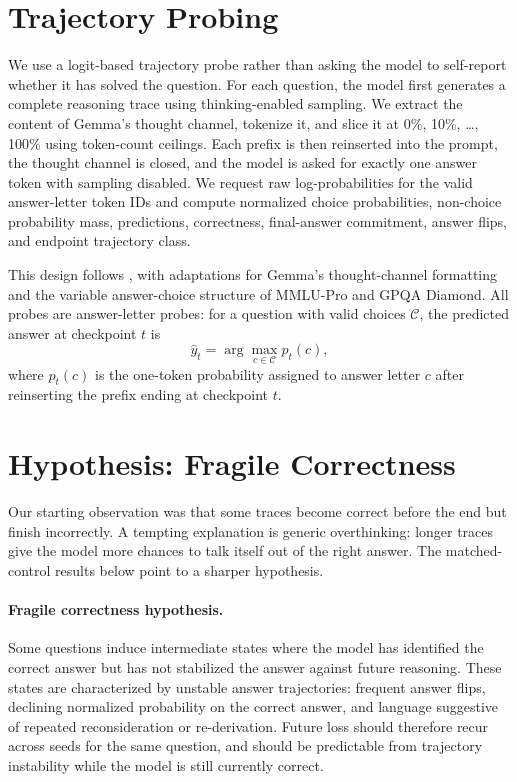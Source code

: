 \documentclass[11pt]{article}
\begin{document}
\section{Trajectory Probing}

We use a logit-based trajectory probe rather than asking the model to
self-report whether it has solved the question. For each question, the model
first generates a complete reasoning trace using thinking-enabled sampling.
We extract the content of Gemma's thought channel, tokenize it, and slice it
at 0\%, 10\%, \ldots, 100\% using token-count ceilings. Each prefix is then
reinserted into the prompt, the thought channel is closed, and the model is
asked for exactly one answer token with sampling disabled. We request raw
log-probabilities for the valid answer-letter token IDs and compute normalized
choice probabilities, non-choice probability mass, predictions, correctness,
final-answer commitment, answer flips, and endpoint trajectory class.

This design follows \citet{ballon2026probing}, with adaptations for
Gemma's thought-channel formatting and the variable answer-choice structure
of MMLU-Pro and GPQA Diamond. All probes are answer-letter probes: for a
question with valid choices $\mathcal{C}$, the predicted answer at checkpoint
$t$ is
\[
  \hat{y}_t = \arg\max_{c \in \mathcal{C}} p_t(c),
\]
where $p_t(c)$ is the one-token probability assigned to answer letter $c$
after reinserting the prefix ending at checkpoint $t$.

\section{Hypothesis: Fragile Correctness}

Our starting observation was that some traces become correct before the end
but finish incorrectly. A tempting explanation is generic overthinking:
longer traces give the model more chances to talk itself out of the right
answer. The matched-control results below point to a sharper hypothesis.

\paragraph{Fragile correctness hypothesis.}
Some questions induce intermediate states where the model has identified the
correct answer but has not stabilized the answer against future reasoning.
These states are characterized by unstable answer trajectories: frequent
answer flips, declining normalized probability on the correct answer, and
language suggestive of repeated reconsideration or re-derivation. Future loss
should therefore recur across seeds for the same question, and should be
predictable from trajectory instability while the model is still currently
correct.
\end{document}
